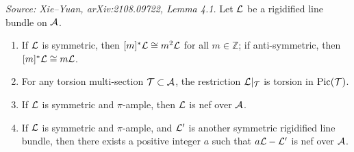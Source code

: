 \begin{lemma}
  \label{lem:lineBundleProps}
  \textit{Source: Xie--Yuan, arXiv:2108.09722, Lemma 4.1.}
  Let \(\mathcal{L}\) be a rigidified line bundle on \(\mathcal{A}\).
  \begin{enumerate}
    \item If \(\mathcal{L}\) is symmetric, then \([m]^*\mathcal{L} \cong m^2\mathcal{L}\) for all \(m \in \mathbb{Z}\);
          if anti-symmetric, then \([m]^*\mathcal{L} \cong m\mathcal{L}\).
    \item For any torsion multi-section \(\mathcal{T} \subset \mathcal{A}\), the restriction \(\mathcal{L}|_{\mathcal{T}}\)
          is torsion in \(\operatorname{Pic}(\mathcal{T})\).
    \item If \(\mathcal{L}\) is symmetric and \(\pi\)-ample, then \(\mathcal{L}\) is nef over \(\mathcal{A}\).
    \item If \(\mathcal{L}\) is symmetric and \(\pi\)-ample, and \(\mathcal{L}'\) is another symmetric
          rigidified line bundle, then there exists a positive integer \(a\) such that
          \(a\mathcal{L} - \mathcal{L}'\) is nef over \(\mathcal{A}\).
  \end{enumerate}
\end{lemma}

